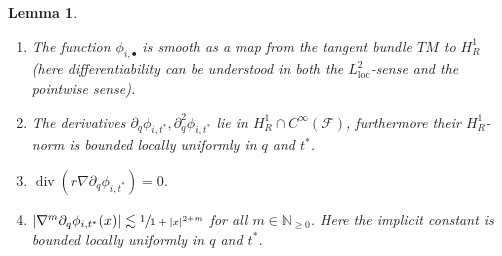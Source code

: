 \documentclass[JEP,XML,SOM,Unicode,published]{cedram}
\newcommand{\loc}{\mathrm{loc}}
\newcommand{\sbullet}{{\scriptscriptstyle\bullet}}
\newtheorem{lemma}[theorem]{Lemma}
\theoremstyle{definition}
\renewcommand{\div}{\operatorname{div}}
\newcommand\N{\mathbb{N}}
\let\de\partial
\begin{document}
\skpt
\begin{lemma}\label{SmoothnessInq}
\begin{enumerate}
\item\label{SmoothnessInqa} The function $\phi_{i,\sbullet}$ is smooth as a map from the tangent bundle $TM$ to $H_R^1$ (here differentiability can be understood in both the $L_{\loc}^2$-sense and the pointwise sense).
\item\label{SmoothnessInqb} The derivatives $\de_q \phi_{i,t^*},\de_q^2\phi_{i,t^*}$ lie in $H_R^1\cap C^\infty(\mathcal{F})$, furthermore their $H_{R}^1$-norm is bounded locally uniformly in $q$ and $t^*$.
\item\label{SmoothnessInqc} $\div(r\nabla\de_q \phi_{i,t^*})=0$.
\item\label{SmoothnessInqd}
$|\nabla^m\de_q\phi_{i,t^*}(x)|\lesssim \sfrac{1}{1+|x|^{2+m}}$ for all $m\in\N_{\geq 0}$.
Here the implicit constant is bounded locally uniformly in $q$ and $t^*$.
\end{enumerate}
\end{lemma}
\end{document}
